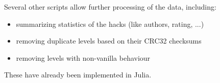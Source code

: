 Several other scripts allow further processing of the data, including:
\begin{itemize}
\item summarizing statistics of the hacks (like authors, rating, ...)
\item removing duplicate levels based on their CRC32 checksums
\item removing levels with non-vanilla behaviour
\end{itemize}
These have already been implemented in Julia.



